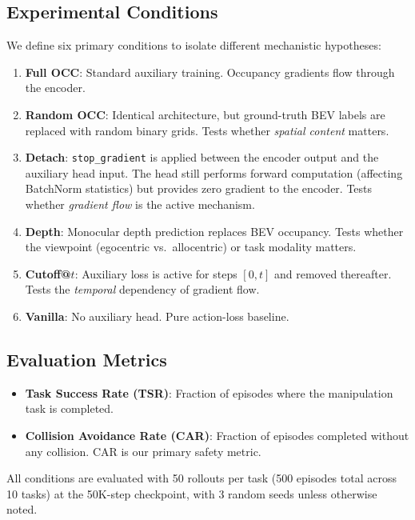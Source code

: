 \documentclass[10pt,letterpaper]{article}
\begin{document}
\subsection{Experimental Conditions}
\label{sec:conditions}

We define six primary conditions to isolate different mechanistic hypotheses:

\begin{enumerate}[nosep,leftmargin=1.5em]
  \item \textbf{Full OCC}: Standard auxiliary training. Occupancy gradients flow through the encoder.
  \item \textbf{Random OCC}: Identical architecture, but ground-truth BEV labels are replaced with random binary grids. Tests whether \emph{spatial content} matters.
  \item \textbf{Detach}: \texttt{stop\_gradient} is applied between the encoder output and the auxiliary head input. The head still performs forward computation (affecting BatchNorm statistics) but provides zero gradient to the encoder. Tests whether \emph{gradient flow} is the active mechanism.
  \item \textbf{Depth}: Monocular depth prediction replaces BEV occupancy. Tests whether the viewpoint (egocentric vs.\ allocentric) or task modality matters.
  \item \textbf{Cutoff@$t$}: Auxiliary loss is active for steps $[0, t]$ and removed thereafter. Tests the \emph{temporal} dependency of gradient flow.
  \item \textbf{Vanilla}: No auxiliary head. Pure action-loss baseline.
\end{enumerate}

\subsection{Evaluation Metrics}
\label{sec:metrics}

\begin{itemize}[nosep,leftmargin=1.5em]
  \item \textbf{Task Success Rate (TSR)}: Fraction of episodes where the manipulation task is completed.
  \item \textbf{Collision Avoidance Rate (CAR)}: Fraction of episodes completed without any collision. CAR is our primary safety metric.
\end{itemize}
All conditions are evaluated with 50 rollouts per task (500 episodes total across 10 tasks) at the 50K-step checkpoint, with 3 random seeds unless otherwise noted.
\end{document}
